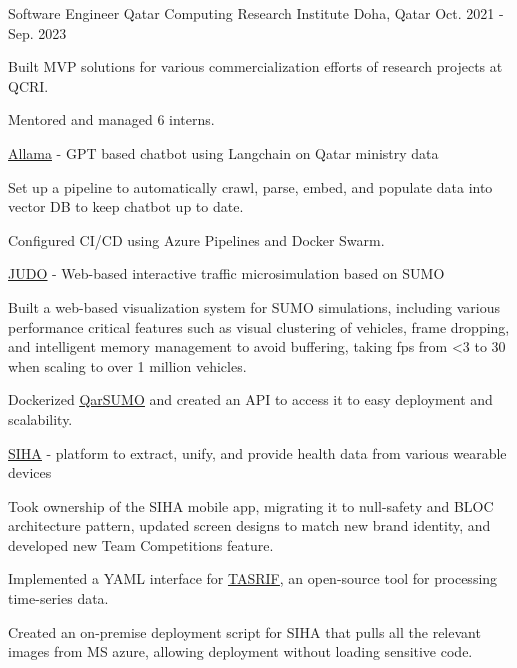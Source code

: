 \begin{cventries}
  \cventry
    {Software Engineer} %
    {Qatar Computing Research Institute} %
    {Doha, Qatar} %
    {Oct. 2021 - Sep. 2023} %
    {
      \begin{cvitems}
        \item {Built MVP solutions for various commercialization efforts of research projects at QCRI.}
        \item {Mentored and managed 6 interns.}
        \renewcommand{\labelitemi}{}
        \item {\hspace{-3.0mm}\underline{{\href{https://allama.qcri.org}{Allama}}} - GPT based chatbot using Langchain on Qatar ministry data}
        \renewcommand{\labelitemi}{\bullet}
        \item {Set up a pipeline to automatically crawl, parse, embed, and populate data into vector DB to keep chatbot up to date.}
        \item {Configured CI/CD using Azure Pipelines and Docker Swarm.}
        \renewcommand{\labelitemi}{}
        \item {\hspace{-3.0mm} \underline{{\href{https://judo.qcri.org}{JUDO}}} - Web-based interactive traffic microsimulation based on SUMO}
        \renewcommand{\labelitemi}{\bullet}
        \item {Built a web-based visualization system for SUMO simulations, including various performance critical features such as visual clustering
        of vehicles, frame dropping, and intelligent memory management to avoid buffering, taking fps from <3 to 30 when scaling to over 1 million vehicles.}
        \item {Dockerized \underline{\href{https://github.com/qcri/qarsumo}{QarSUMO}} and created an API to access it to easy deployment and scalability.}
        \renewcommand{\labelitemi}{}
        \item {\hspace{-3.0mm}\underline{{\href{https://siha.qcri.org}{SIHA}}} - platform to extract, unify, and provide health data from various wearable devices}
        \renewcommand{\labelitemi}{\bullet}
        \item {Took ownership of the SIHA mobile app, migrating it to null-safety and BLOC architecture pattern, updated screen designs to match new brand identity, and developed new Team Competitions feature.}
        \item {Implemented a YAML interface for \underline{\href{https://github.com/qcri/tasrif}{TASRIF}}, an open-source tool for processing time-series data.}
        \item {Created an on-premise deployment script for SIHA that pulls all the relevant images from MS azure, allowing deployment without loading sensitive code.}
      \end{cvitems}
    }


\end{cventries}
